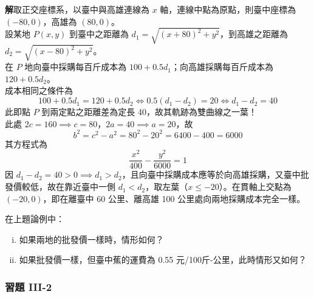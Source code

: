 \begin{example}
\textbf{解}\quad 取正交座標系，以臺中與高雄連線為 $x$ 軸，連線中點為原點，則臺中座標為 $(-80, 0)$，高雄為 $(80, 0)$。\\
設某地 $P(x,y)$ 到臺中之距離為 $d_1 = \sqrt{(x+80)^2 + y^2}$，到高雄之距離為 $d_2 = \sqrt{(x-80)^2 + y^2}$。\\
在 $P$ 地向臺中採購每百斤成本為 $100 + 0.5 d_1$；向高雄採購每百斤成本為 $120 + 0.5 d_2$。\\
成本相同之條件為
\[ 100 + 0.5 d_1 = 120 + 0.5 d_2 \iff 0.5(d_1 - d_2) = 20 \iff d_1 - d_2 = 40 \]
此即點 $P$ 到兩定點之距離差為定長 40，故其軌跡為雙曲線之一葉！\\
此處 $2c = 160 \implies c = 80$，$2a = 40 \implies a = 20$，故
\[ b^2 = c^2 - a^2 = 80^2 - 20^2 = 6400 - 400 = 6000 \]
其方程式為
\[ \frac{x^2}{400} - \frac{y^2}{6000} = 1 \]
因 $d_1 - d_2 = 40 > 0 \implies d_1 > d_2$，且向臺中採購成本應等於向高雄採購，又臺中批發價較低，故在靠近臺中一側 $d_1 < d_2$，取左葉（$x \le -20$）。在貫軸上交點為 $(-20, 0)$，即在離臺中 60 公里、離高雄 100 公里處向兩地採購成本完全一樣。
\end{example}

\begin{exercise}
在上題論例中：
\begin{enumerate}[(i)]
  \item 如果兩地的批發價一樣時，情形如何？
  \item 如果批發價一樣，但臺中蕉的運費為 0.55 元/100斤-公里，此時情形又如何？
\end{enumerate}
\end{exercise}

\subsubsection*{習題 III-2}

